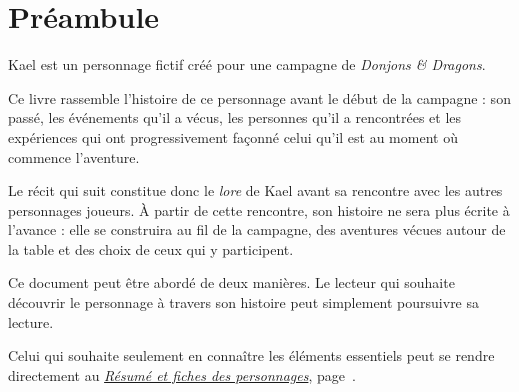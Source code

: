\chapter*{Préambule}

Kael est un personnage fictif créé pour une campagne de
\emph{Donjons \& Dragons}.

Ce livre rassemble l'histoire de ce personnage avant le début de la campagne :
son passé, les événements qu'il a vécus, les personnes qu'il a rencontrées et
les expériences qui ont progressivement façonné celui qu'il est au moment où
commence l'aventure.

Le récit qui suit constitue donc le \emph{lore} de Kael avant sa rencontre
avec les autres personnages joueurs. À partir de cette rencontre, son histoire
ne sera plus écrite à l'avance : elle se construira au fil de la campagne,
des aventures vécues autour de la table et des choix de ceux qui y participent.

Ce document peut être abordé de deux manières. Le lecteur qui souhaite
découvrir le personnage à travers son histoire peut simplement poursuivre
sa lecture.

Celui qui souhaite seulement en connaître les éléments essentiels peut
se rendre directement au
\hyperref[chap:resume-personnages]{\emph{Résumé et fiches des personnages}},
page~\pageref{chap:resume-personnages}.